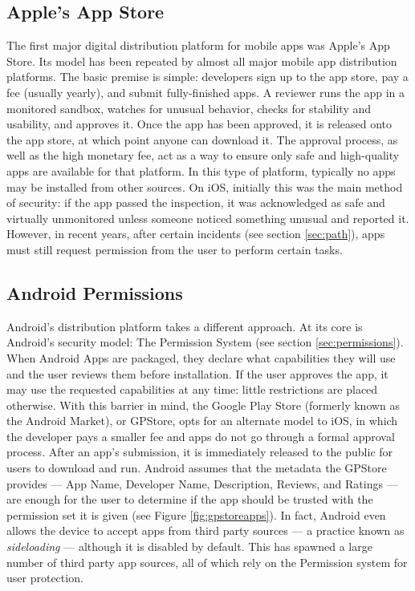 \subsection{Apple's App Store}
The first major digital distribution platform for mobile apps was Apple's App Store\citep{AppleAppStore}. Its model has been repeated by almost all major mobile app distribution platforms. The basic premise is simple: developers sign up to the app store, pay a fee (usually yearly), and submit fully-finished apps. A reviewer runs the app in a monitored sandbox, watches for unusual behavior, checks for stability and usability, and approves it. Once the app has been approved, it is released onto the app store, at which point anyone can download it. The approval process, as well as the high monetary fee, act as a way to ensure only safe and high-quality apps are available for that platform. In this type of platform, typically no apps may be installed from other sources. On iOS, initially this was the main method of security: if the app passed the inspection, it was acknowledged as safe and virtually unmonitored unless someone noticed something unusual and reported it. However, in recent years, after certain incidents (see section \ref{sec:path}), apps must still request permission from the user to perform certain tasks.

\subsection{Android Permissions}
Android's distribution platform takes a different approach. At its core is Android's security model: The Permission System (see section \ref{sec:permissions}). When Android Apps are packaged, they declare what capabilities they will use and the user reviews them before installation. If the user approves the app, it may use the requested capabilities at any time: little restrictions are placed otherwise. With this barrier in mind, the Google Play Store (formerly known as the Android Market), or GPStore, opts for an alternate model to iOS, in which the developer pays a smaller fee and apps do not go through a formal approval process. After an app's submission, it is immediately released to the public for users to download and run. Android assumes that the metadata the GPStore provides --- App Name, Developer Name, Description, Reviews, and Ratings --- are enough for the user to determine if the app should be trusted with the permission set it is given (see Figure \ref{fig:gpstoreapps}). In fact, Android even allows the device to accept apps from third party sources --- a practice known as \textit{sideloading} --- although it is disabled by default. This has spawned a large number of third party app sources, all of which rely on the Permission system for user protection.

